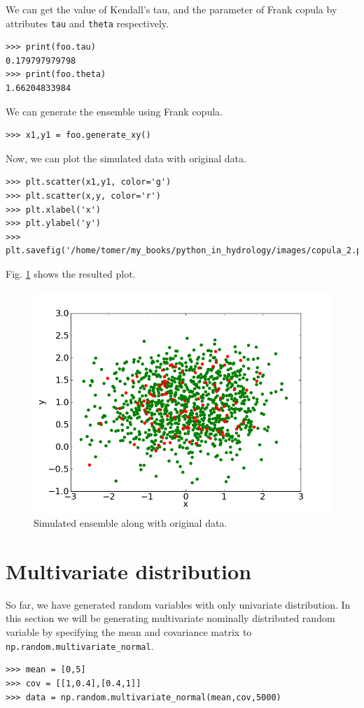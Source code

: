 \documentclass[10pt]{book}
\begin{document}
We can get the value of Kendall's tau, and the parameter of Frank copula by attributes \verb"tau" and \verb"theta" respectively. 
\beforeverb \begin{verbatim}
>>> print(foo.tau)
0.179797979798
>>> print(foo.theta)
1.66204833984
\end{verbatim} \afterverb

We can generate the ensemble using Frank copula. 
\beforeverb \begin{verbatim}
>>> x1,y1 = foo.generate_xy()
\end{verbatim} \afterverb

Now, we can plot the simulated data with original data.
\beforeverb \begin{verbatim}
>>> plt.scatter(x1,y1, color='g')
>>> plt.scatter(x,y, color='r')
>>> plt.xlabel('x')
>>> plt.ylabel('y')
>>> plt.savefig('/home/tomer/my_books/python_in_hydrology/images/copula_2.png')
\end{verbatim} \afterverb

Fig. \ref{fig:copula2} shows the resulted plot. 
\beforefig
\begin{figure}[h!]
  \centering
    \includegraphics[scale=0.5]{images/copula_2.png}
  \caption{Simulated ensemble along with original data.}
   \label{fig:copula2}
\end{figure}
\afterfig

\section{Multivariate distribution}
So far, we have generated random variables with only univariate distribution. In this section we will be generating multivariate nominally distributed random variable by specifying the mean and covariance matrix to \verb"np.random.multivariate_normal". 
\beforeverb \begin{verbatim}
>>> mean = [0,5]
>>> cov = [[1,0.4],[0.4,1]]
>>> data = np.random.multivariate_normal(mean,cov,5000)
\end{verbatim} \afterverb
\end{document}
